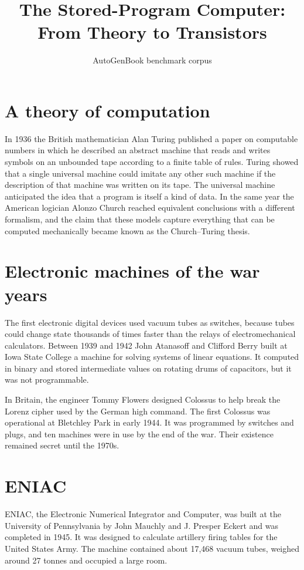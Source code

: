 \documentclass[11pt,a4paper]{article}
\title{The Stored-Program Computer: From Theory to Transistors}
\author{AutoGenBook benchmark corpus}
\date{}
\begin{document}
\maketitle
\thispagestyle{fancy}

\section{A theory of computation}

In 1936 the British mathematician Alan Turing published a paper on computable
numbers in which he described an abstract machine that reads and writes
symbols on an unbounded tape according to a finite table of rules. Turing
showed that a single universal machine could imitate any other such machine
if the description of that machine was written on its tape. The universal
machine anticipated the idea that a program is itself a kind of data. In the
same year the American logician Alonzo Church reached equivalent conclusions
with a different formalism, and the claim that these models capture
everything that can be computed mechanically became known as the
Church--Turing thesis.

\section{Electronic machines of the war years}

The first electronic digital devices used vacuum tubes as switches, because
tubes could change state thousands of times faster than the relays of
electromechanical calculators. Between 1939 and 1942 John Atanasoff and
Clifford Berry built at Iowa State College a machine for solving systems of
linear equations. It computed in binary and stored intermediate values on
rotating drums of capacitors, but it was not programmable.

In Britain, the engineer Tommy Flowers designed Colossus to help break the
Lorenz cipher used by the German high command. The first Colossus was
operational at Bletchley Park in early 1944. It was programmed by switches
and plugs, and ten machines were in use by the end of the war. Their
existence remained secret until the 1970s.

\section{ENIAC}

ENIAC, the Electronic Numerical Integrator and Computer, was built at the
University of Pennsylvania by John Mauchly and J. Presper Eckert and was
completed in 1945. It was designed to calculate artillery firing tables for
the United States Army. The machine contained about 17,468 vacuum tubes,
weighed around 27 tonnes and occupied a large room.
\end{document}
